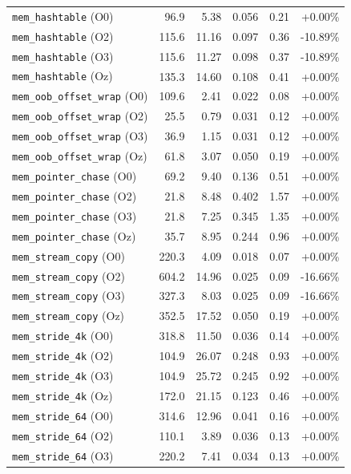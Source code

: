 {\begin{longtable}{lrrrrr}
\texttt{mem\_hashtable} (O0) & 96.9 & 5.38 & 0.056 & 0.21 & +0.00\% \\
\texttt{mem\_hashtable} (O2) & 115.6 & 11.16 & 0.097 & 0.36 & -10.89\% \\
\texttt{mem\_hashtable} (O3) & 115.6 & 11.27 & 0.098 & 0.37 & -10.89\% \\
\texttt{mem\_hashtable} (Oz) & 135.3 & 14.60 & 0.108 & 0.41 & +0.00\% \\
\texttt{mem\_oob\_offset\_wrap} (O0) & 109.6 & 2.41 & 0.022 & 0.08 & +0.00\% \\
\texttt{mem\_oob\_offset\_wrap} (O2) & 25.5 & 0.79 & 0.031 & 0.12 & +0.00\% \\
\texttt{mem\_oob\_offset\_wrap} (O3) & 36.9 & 1.15 & 0.031 & 0.12 & +0.00\% \\
\texttt{mem\_oob\_offset\_wrap} (Oz) & 61.8 & 3.07 & 0.050 & 0.19 & +0.00\% \\
\texttt{mem\_pointer\_chase} (O0) & 69.2 & 9.40 & 0.136 & 0.51 & +0.00\% \\
\texttt{mem\_pointer\_chase} (O2) & 21.8 & 8.48 & 0.402 & 1.57 & +0.00\% \\
\texttt{mem\_pointer\_chase} (O3) & 21.8 & 7.25 & 0.345 & 1.35 & +0.00\% \\
\texttt{mem\_pointer\_chase} (Oz) & 35.7 & 8.95 & 0.244 & 0.96 & +0.00\% \\
\texttt{mem\_stream\_copy} (O0) & 220.3 & 4.09 & 0.018 & 0.07 & +0.00\% \\
\texttt{mem\_stream\_copy} (O2) & 604.2 & 14.96 & 0.025 & 0.09 & -16.66\% \\
\texttt{mem\_stream\_copy} (O3) & 327.3 & 8.03 & 0.025 & 0.09 & -16.66\% \\
\texttt{mem\_stream\_copy} (Oz) & 352.5 & 17.52 & 0.050 & 0.19 & +0.00\% \\
\texttt{mem\_stride\_4k} (O0) & 318.8 & 11.50 & 0.036 & 0.14 & +0.00\% \\
\texttt{mem\_stride\_4k} (O2) & 104.9 & 26.07 & 0.248 & 0.93 & +0.00\% \\
\texttt{mem\_stride\_4k} (O3) & 104.9 & 25.72 & 0.245 & 0.92 & +0.00\% \\
\texttt{mem\_stride\_4k} (Oz) & 172.0 & 21.15 & 0.123 & 0.46 & +0.00\% \\
\texttt{mem\_stride\_64} (O0) & 314.6 & 12.96 & 0.041 & 0.16 & +0.00\% \\
\texttt{mem\_stride\_64} (O2) & 110.1 & 3.89 & 0.036 & 0.13 & +0.00\% \\
\texttt{mem\_stride\_64} (O3) & 220.2 & 7.41 & 0.034 & 0.13 & +0.00\% \\

\end{longtable}}
